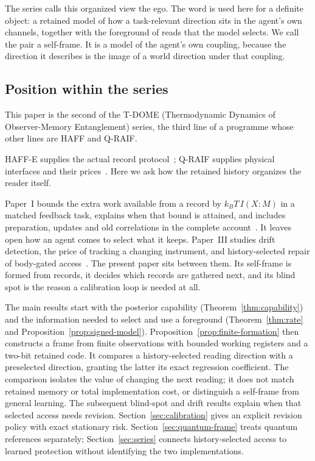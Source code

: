 \documentclass[12pt]{article}
\theoremstyle{definition}
\begin{document}
The series calls this organized view the ego. The word is used here for a definite object: a retained model of how a task-relevant direction sits in the agent's own channels, together with the foreground of reads that the model selects. We call the pair a self-frame. It is a model of the agent's own coupling, because the direction it describes is the image of a world direction under that coupling.

\subsection{Position within the series}

This paper is the second of the T-DOME (Thermodynamic Dynamics of Observer-Memory Entanglement) series, the third line of a programme whose other lines are HAFF and Q-RAIF.

HAFF-E supplies the actual record protocol~\cite{Liu2026HAFF_E};
Q-RAIF supplies physical interfaces and their prices~\cite{Liu2026QRAIF_B}.
Here we ask how the retained history organizes the reader itself.

Paper~I bounds the extra work available from a record by $k_BT\,I(X{:}M)$ in a matched feedback task, explains when that bound is attained, and includes preparation, updates and old correlations in the complete account~\cite{Liu2026TDOME_I}. It leaves open how an agent comes to select what it keeps. Paper~III studies drift detection, the price of tracking a changing instrument, and history-selected repair of body-gated access~\cite{Liu2026TDOME_III}. The present paper sits between them. Its self-frame is formed from records, it decides which records are gathered next, and its blind spot is the reason a calibration loop is needed at all.

The main results start with the posterior capability
(Theorem~\ref{thm:capability}) and the information needed to select and
use a foreground (Theorem~\ref{thm:rate} and
Proposition~\ref{prop:signed-model}). Proposition~\ref{prop:finite-formation}
then constructs a frame from finite observations with bounded working
registers and a two-bit retained code. It compares a history-selected
reading direction with a preselected direction, granting the latter its
exact regression coefficient. The comparison isolates the value of
changing the next reading; it does not match retained memory or total
implementation cost, or distinguish a self-frame from general learning.
The subsequent blind-spot and drift results explain when that selected
access needs revision. Section~\ref{sec:calibration} gives an explicit
revision policy with exact stationary risk.
Section~\ref{sec:quantum-frame} treats quantum references separately;
Section~\ref{sec:series} connects history-selected access to learned
protection without identifying the two implementations.
\end{document}
